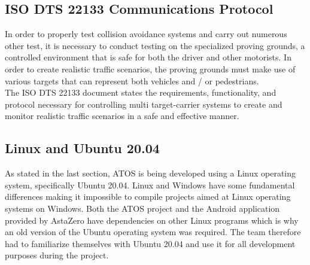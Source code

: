 \subsection{ISO DTS 22133 Communications Protocol}
In order to properly test collision avoidance systems and carry out numerous other test, it is necessary to conduct testing on the specialized proving grounds, a controlled environment that is safe for both the driver and other motorists. In order to create realistic traffic scenarios, the proving grounds must make use of various targets that can represent both vehicles and / or pedestrians. \\

The ISO DTS 22133 document states the requirements, functionality, and protocol necessary for controlling multi target-carrier systems to create and monitor realistic traffic scenarios in a safe and effective manner.


\subsection{Linux and Ubuntu 20.04}
As stated in the last section, ATOS is being developed using a Linux operating system, specifically Ubuntu 20.04. Linux and Windows have some fundamental differences making it impossible to compile projects aimed at Linux operating systems on Windows. Both the ATOS project and the Android application provided by AstaZero have dependencies on other Linux programs which is why an old version of the Ubuntu operating system was required. The team therefore had to familiarize themselves with Ubuntu 20.04 and use it for all development purposes during the project. 

